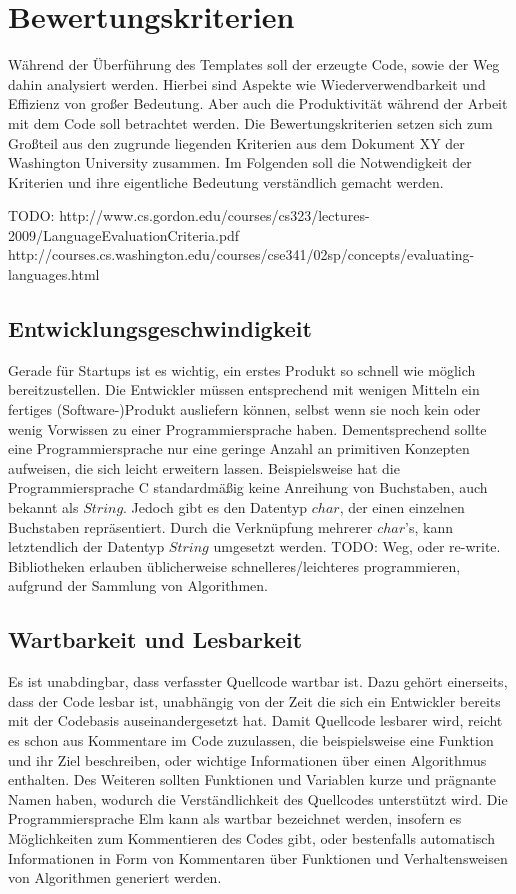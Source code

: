 \section{Bewertungskriterien}
\label{sec:Bewertungskriterien}
Während der Überführung des Templates soll der erzeugte Code, sowie der Weg dahin analysiert werden. Hierbei sind Aspekte wie Wiederverwendbarkeit und Effizienz von großer Bedeutung. Aber auch die Produktivität während der Arbeit mit dem Code soll betrachtet werden. Die Bewertungskriterien setzen sich zum Großteil aus den zugrunde liegenden Kriterien aus dem Dokument XY der Washington University zusammen. Im Folgenden soll die Notwendigkeit der Kriterien und ihre eigentliche Bedeutung verständlich gemacht werden.

TODO: http://www.cs.gordon.edu/courses/cs323/lectures-2009/LanguageEvaluationCriteria.pdf\\
http://courses.cs.washington.edu/courses/cse341/02sp/concepts/evaluating-languages.html

\subsection{Entwicklungsgeschwindigkeit}
\label{sec:Entwicklungsgeschwindigkeit}
Gerade für Startups ist es wichtig, ein erstes Produkt so schnell wie möglich bereitzustellen. Die Entwickler müssen entsprechend mit wenigen Mitteln ein fertiges (Software-)Produkt ausliefern können, selbst wenn sie noch kein oder wenig Vorwissen zu einer Programmiersprache haben.
Dementsprechend sollte eine Programmiersprache nur eine geringe Anzahl an primitiven Konzepten aufweisen, die sich leicht erweitern lassen. Beispielsweise hat die Programmiersprache C standardmäßig keine Anreihung von Buchstaben, auch bekannt als $String$. Jedoch gibt es den Datentyp $char$, der einen einzelnen Buchstaben repräsentiert. Durch die Verknüpfung mehrerer $char$'s, kann letztendlich der Datentyp $String$ umgesetzt werden. TODO: Weg, oder re-write. Bibliotheken erlauben üblicherweise schnelleres/leichteres programmieren, aufgrund der Sammlung von Algorithmen.


\subsection{Wartbarkeit und Lesbarkeit}
\label{sec:Wartbarkeit}
Es ist unabdingbar, dass verfasster Quellcode wartbar ist. Dazu gehört einerseits, dass der Code lesbar ist, unabhängig von der Zeit die sich ein Entwickler bereits mit der Codebasis auseinandergesetzt hat. Damit Quellcode lesbarer wird, reicht es schon aus Kommentare im Code zuzulassen, die beispielsweise eine Funktion und ihr Ziel beschreiben, oder wichtige Informationen über einen Algorithmus enthalten. Des Weiteren sollten Funktionen und Variablen kurze und prägnante Namen haben, wodurch die Verständlichkeit des Quellcodes unterstützt wird. Die Programmiersprache Elm kann als wartbar bezeichnet werden, insofern es Möglichkeiten zum Kommentieren des Codes gibt, oder bestenfalls automatisch Informationen in Form von Kommentaren über Funktionen und Verhaltensweisen von Algorithmen generiert werden.


